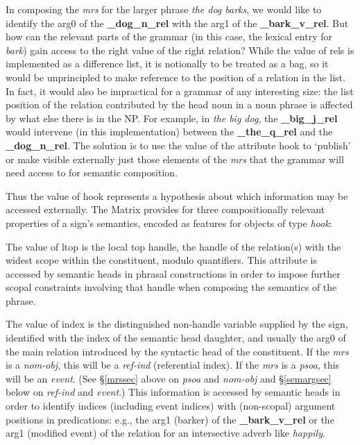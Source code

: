 \documentclass[12pt]{article}
\newcommand{\es}{\enumsentence}
\begin{document}
In composing the {\it mrs} for the larger phrase {\it the dog barks},
we would like to identify the {\sc arg0} of the {\bf \_dog\_n\_rel} with the
{\sc arg1} of the {\bf \_bark\_v\_rel}.  But how can the relevant parts of
the grammar (in this case, the lexical entry for {\it bark}) gain
access to the right value of the right relation?  While the value of
{\sc rels} is implemented as a difference list, it is notionally to be
treated as a bag, so it would be unprincipled
to make reference to the position of a relation in
the list.  In fact, it would also be impractical for a grammar of any
interesting size: the list position of the
relation contributed by the head noun in a noun phrase
is affected by what else there is in the NP.  For example, in {\it the
big dog}, the {\bf \_big\_j\_rel} would intervene (in this implementation)
between the {\bf \_the\_q\_rel} and the {\bf \_dog\_n\_rel}.  The solution is 
to use the value of the attribute {\sc hook} to `publish' or make visible 
externally just those elements of the {\it mrs} that the grammar will need
access to for semantic composition.

Thus the value of {\sc hook} represents a hypothesis about which 
information may be accessed externally.  The Matrix provides for
three compositionally relevant properties of a sign's semantics, encoded as
features for objects of type {\it hook}:

\es{
\begin{avm}
{\it hook}: \[ ltop & handle\\
               index & individual\\
               xarg & individual \]
\end{avm}
}

\noindent
The value of {\sc ltop} is the local top handle, the handle
of the relation(s) with the widest scope within the constituent, modulo
quantifiers.   This attribute
is accessed by semantic heads in phrasal constructions in order
to impose further scopal constraints involving that handle when composing
the semantics of the phrase.

The value of {\sc index} is the distinguished non-handle variable supplied
by the sign, identified with the {\sc index} of the semantic head daughter,
and usually the {\sc arg0} of the main relation introduced by the syntactic 
head of
the constituent.  If the {\it mrs} is a {\it nom-obj}, this will be a
{\it ref-ind} (referential index).  If the {\it mrs} is a {\it psoa},
this will be an {\it event}.  (See \S\ref{mrssec} above on {\it psoa}
and {\it nom-obj} and \S\ref{semargsec} below on {\it ref-ind} and {\it
event}.)  
This information is accessed by semantic heads
in order to identify indices (including event
indices) with (non-scopal) argument positions in predications: e.g.,
the {\sc arg1} (barker) of the {\bf \_bark\_v\_rel} or the {\sc arg1}
(modified event) of the relation for an intersective adverb like {\it happily}.
\end{document}

